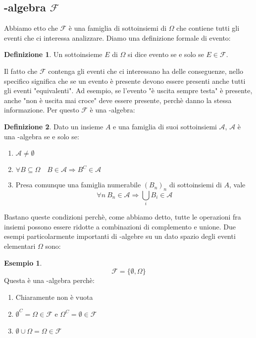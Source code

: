 \documentclass{article}
\theoremstyle{plain}
\theoremstyle{definition}
\newtheorem{definizione}{Definizione}[section]
\newtheorem{esempio}{Esempio}[section]
\theoremstyle{remark}
\begin{document}
\subsection{\sigma-algebra $\mathcal{F}$} %
\label{sub:sigma_algebra_f}
Abbiamo etto che $\mathcal{F}$ è una famiglia di sottoinsiemi di $\Omega$ che contiene tutti gli eventi che ci interessa analizzare. Diamo una definizione formale di evento:
\begin{definizione}
	Un sottoinsieme $E$ di $\Omega$ si dice evento se e solo se $E\in\mathcal{F}$.
\end{definizione}
Il fatto che $\mathcal{F}$ contenga gli eventi che ci interessano ha delle conseguenze, nello specifico significa che se un evento è presente devono essere presenti anche tutti gli eventi "equivalenti". Ad esempio, se l'evento "è uscita sempre testa" è presente, anche "non è uscita mai croce" deve essere presente, perchè danno la stessa informazione. Per questo $\mathcal{F}$ è una \sigma-algebra:
\begin{definizione}
	Dato un insieme $A$ e una famiglia di suoi sottoinsiemi $\mathcal{A}$, $\mathcal{A}$ è una \sigma-algebra se e solo se:
	\begin{enumerate}
		\item $\mathcal{A}\neq\emptyset$
		\item $\forall B\subseteq\Omega\quad B\in\mathcal{A}\Rightarrow B^C\in\mathcal{A}$
		\item Presa comunque una famiglia numerabile $(B_n)_n$ di sottoinsiemi di $A$, vale
		\begin{equation*}
			\forall n\ B_n\in\mathcal{A}\Rightarrow\bigcup_i B_i\in\mathcal{A}
		\end{equation*}
	\end{enumerate}
\end{definizione}
Bastano queste condizioni perchè, come abbiamo detto, tutte le operazioni fra insiemi possono essere ridotte a combinazioni di complemento e unione. Due esempi particolarmente importanti di \sigma-algebre su un dato spazio degli eventi elementari $\Omega$ sono:
\begin{esempio}
	\begin{equation*}
		\mathcal{F}=\{\emptyset, \Omega\}
	\end{equation*}
	Questa è una \sigma-algebra perchè:
	\begin{enumerate}
		\item Chiaramente non è vuota
		\item $\emptyset^C=\Omega\in\mathcal{F}$ e $\Omega^C=\emptyset\in\mathcal{F}$
		\item $\emptyset\cup\Omega=\Omega\in\mathcal{F}$
	\end{enumerate}
\end{esempio}
\end{document}
